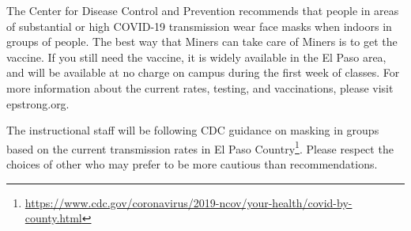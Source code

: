 The Center for Disease Control and Prevention recommends that people 
in areas of substantial or high COVID-19 transmission wear face masks when indoors in groups of people. 
The best way that Miners can take care of Miners is to get the vaccine. 
If you still need the vaccine, it is widely available in the El Paso area, 
and will be available at no charge on campus during the first week of classes. 
For more information about the current rates, testing, and vaccinations, please visit epstrong.org.

\begin{tcolorbox}[colback=red!5,colframe=red!75!black,title=Masks in the classroom]
The instructional staff will be following CDC guidance on masking in groups based on the current transmission rates in El Paso Country\footnote{\url{https://www.cdc.gov/coronavirus/2019-ncov/your-health/covid-by-county.html}}. 
Please respect the choices of other who may prefer to be more cautious than recommendations. 
\end{tcolorbox}

%
%
%


